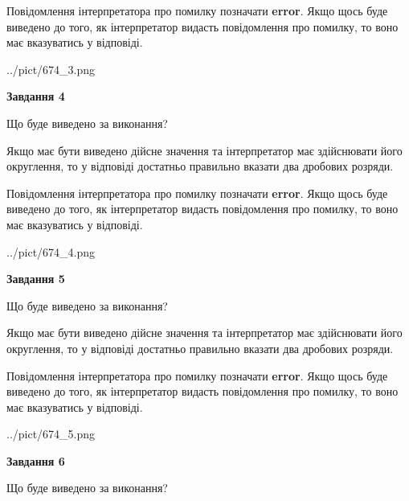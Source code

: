 \documentclass[12pt, ukrainian]{article}
\begin{document}
{\begin {Large}
Повідомлення інтерпретатора про помилку позначати \textbf{error}.
Якщо щось буде виведено до того, як інтерпретатор видасть повідомлення про помилку, 
то воно має вказуватись у відповіді. \par

\begin{center}
	{../pict/674_3.png}
\end{center}
\newpage

{\begin {center}\textbf{Завдання 4}\end {center}}\par
Що буде виведено за виконання? \par

Якщо має бути виведено дійсне значення та інтерпретатор має здійснювати його округлення, 
то у відповіді достатньо правильно вказати два дробових розряди.

Повідомлення інтерпретатора про помилку позначати \textbf{error}.
Якщо щось буде виведено до того, як інтерпретатор видасть повідомлення про помилку, 
то воно має вказуватись у відповіді. \par

\begin{center}
	{../pict/674_4.png}
\end{center}
\newpage

{\begin {center}\textbf{Завдання 5}\end {center}}\par
Що буде виведено за виконання? \par

Якщо має бути виведено дійсне значення та інтерпретатор має здійснювати його округлення, 
то у відповіді достатньо правильно вказати два дробових розряди.

Повідомлення інтерпретатора про помилку позначати \textbf{error}.
Якщо щось буде виведено до того, як інтерпретатор видасть повідомлення про помилку, 
то воно має вказуватись у відповіді. \par

\begin{center}
	{../pict/674_5.png}
\end{center}
\newpage

{\begin {center}\textbf{Завдання 6}\end {center}}\par
Що буде виведено за виконання? \par


\end{Large}}
\end{document}
